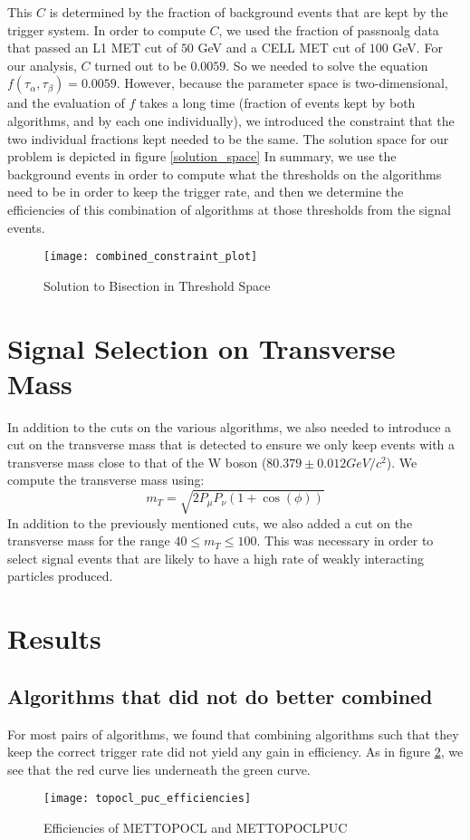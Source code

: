 This $C$ is determined by the fraction of background events that are kept by the trigger system. 
In order to compute $C$, we used the fraction of passnoalg data that passed an L1 MET cut of $50$ GeV and a CELL MET cut of $100$ GeV. 
For our analysis, $C$ turned out to be $0.0059$.
So we needed to solve the equation $f(\tau_{\alpha},\tau_{\beta})=0.0059$. 
However, because the parameter space is two-dimensional, and the evaluation of $f$ takes a long time (fraction of events kept by both algorithms, and by each one individually), we introduced the constraint that the two individual fractions kept needed to be the same. The solution space for our problem is depicted in figure \ref{solution_space}
In summary, we use the background events in order to compute what the thresholds on the algorithms need to be in order to keep the trigger rate, and then we determine the efficiencies of this combination of algorithms at those thresholds from the signal events. 
\begin{figure}[h]
        \centering
        \texttt{[image: combined\_constraint\_plot]}
        \caption{Solution to Bisection in Threshold Space}
        \label{no_gain_efficiency}
\end{figure}
\section{Signal Selection on Transverse Mass}
In addition to the cuts on the various algorithms, we also needed to introduce a cut on the transverse mass that is detected to ensure we only keep events with a transverse mass close to that of the W boson ($80.379\pm 0.012 GeV/c^2$). 
We compute the transverse mass using:
$$m_{T}=\sqrt{2P_{\mu}P_{\nu}(1+\cos{(\phi)})}$$
In addition to the previously mentioned cuts, we also added a cut on the transverse mass for the range $40 \leq m_{T} \leq 100$. 
This was necessary in order to select signal events that are likely to have a high rate of weakly interacting particles produced.
\pagebreak
\section{Results}
\subsection{Algorithms that did not do better combined}
For most pairs of algorithms, we found that combining algorithms such that they keep the correct trigger rate did not yield any gain in efficiency. As in figure \ref{no_gain_efficiency}, we see that the red curve lies underneath the green curve. 
\begin{figure}[h]
        \centering
        \texttt{[image: topocl\_puc\_efficiencies]}
        \caption{Efficiencies of METTOPOCL and METTOPOCLPUC}
        \label{no_gain_efficiency}
\end{figure}
\clearpage
